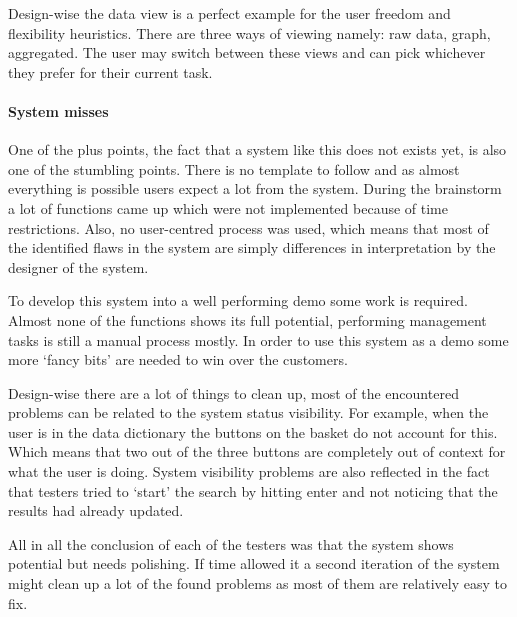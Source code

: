 Design-wise the data view is a perfect example for the user freedom and flexibility heuristics.
There are three ways of viewing namely: raw data, graph, aggregated.
The user may switch between these views and can pick whichever they prefer for their current task.

\paragraph{System misses}
One of the plus points, the fact that a system like this does not exists yet, is also one of the stumbling points.
There is no template to follow and as almost everything is possible users expect a lot from the system.
During the brainstorm a lot of functions came up which were not implemented because of time restrictions.
Also, no user-centred process was used, which means that most of the identified flaws in the system are simply differences in interpretation by the designer of the system.

To develop this system into a well performing demo some work is required.
Almost none of the functions shows its full potential, performing management tasks is still a manual process mostly.
In order to use this system as a demo some more `fancy bits' are needed to win over the customers.

Design-wise there are a lot of things to clean up, most of the encountered problems can be related to the system status visibility.
For example, when the user is in the data dictionary the buttons on the basket do not account for this.
Which means that two out of the three buttons are completely out of context for what the user is doing.
System visibility problems are also reflected in the fact that testers tried to `start' the search by hitting enter and not noticing that the results had already updated.

All in all the conclusion of each of the testers was that the system shows potential but needs polishing.
If time allowed it a second iteration of the system might clean up a lot of the found problems as most of them are relatively easy to fix.
